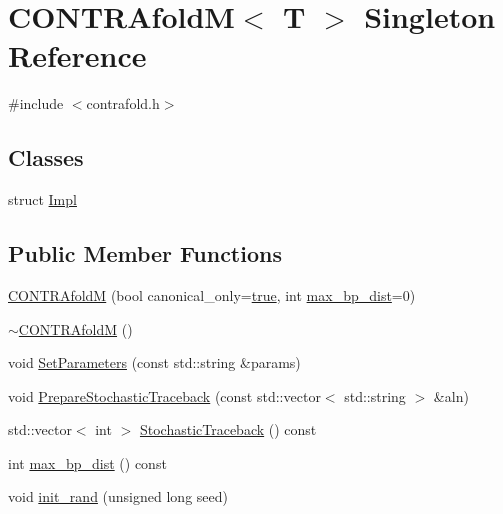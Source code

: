 \hypertarget{class_c_o_n_t_r_afold_m}{\section{C\+O\+N\+T\+R\+Afold\+M$<$ T $>$ Singleton Reference}
\label{class_c_o_n_t_r_afold_m}
}


{\ttfamily \#include $<$contrafold.\+h$>$}

\subsection*{Classes}
\begin{DoxyCompactItemize}
\item 
struct \hyperlink{struct_c_o_n_t_r_afold_m_1_1_impl}{Impl}
\end{DoxyCompactItemize}
\subsection*{Public Member Functions}
\begin{DoxyCompactItemize}
\item 
\hyperlink{class_c_o_n_t_r_afold_m_a54c2eb55b2fe2373fc65082e703a2451}{C\+O\+N\+T\+R\+Afold\+M} (bool canonical\+\_\+only=\hyperlink{naview_8c_a41f9c5fb8b08eb5dc3edce4dcb37fee7}{true}, int \hyperlink{class_c_o_n_t_r_afold_m_a570e8b37cff3eb4b209887c945c6c0e2}{max\+\_\+bp\+\_\+dist}=0)
\item 
\hyperlink{class_c_o_n_t_r_afold_m_a082da7d79490b4486f53dd9db690ae5e}{$\sim$\+C\+O\+N\+T\+R\+Afold\+M} ()
\item 
void \hyperlink{class_c_o_n_t_r_afold_m_a0cb61bfc2041ae9c2bcd728d164d282b}{Set\+Parameters} (const std\+::string \&params)
\item 
void \hyperlink{class_c_o_n_t_r_afold_m_aff5063a0be49d563cce5ca75b2015e3c}{Prepare\+Stochastic\+Traceback} (const std\+::vector$<$ std\+::string $>$ \&aln)
\item 
std\+::vector$<$ int $>$ \hyperlink{class_c_o_n_t_r_afold_m_a7f134463e37ab38eb12e958a6e4e9182}{Stochastic\+Traceback} () const 
\item 
int \hyperlink{class_c_o_n_t_r_afold_m_a570e8b37cff3eb4b209887c945c6c0e2}{max\+\_\+bp\+\_\+dist} () const 
\item 
void \hyperlink{class_c_o_n_t_r_afold_m_ad7b33eb2bd8a95e445b14b6791b07d7c}{init\+\_\+rand} (unsigned long seed)
\end{DoxyCompactItemize}



